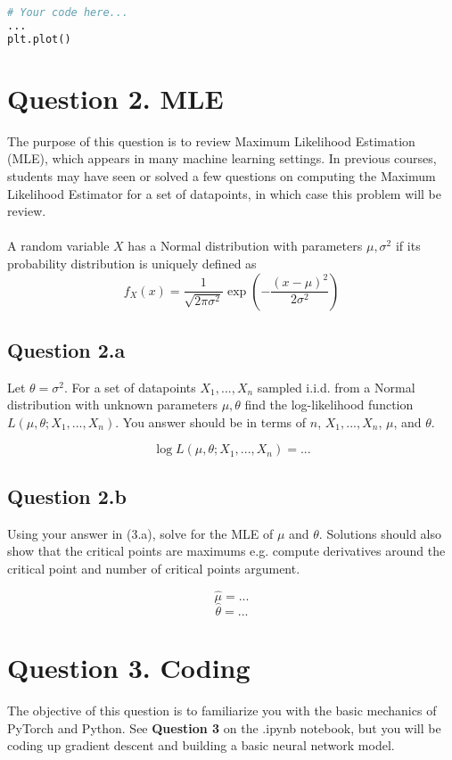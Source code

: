 \documentclass[12pt]{article}
\begin{document}
\begin{solution}
\begin{lstlisting}[language=Python]
# Your code here...
...
plt.plot()
\end{lstlisting}
\end{solution}
\newpage

\section*{Question 2. MLE }
The purpose of this question is to review Maximum Likelihood Estimation (MLE), which appears in many machine learning settings. In previous courses, students may have seen or solved a few questions on computing the Maximum Likelihood Estimator for a set of datapoints, in which case this problem will be review.
\\\\
A random variable $X$ has a Normal distribution with parameters $\mu,\sigma^2$ if its probability distribution is uniquely defined as
$$ f_X(x) = \frac{1}{\sqrt{2\pi \sigma^2}} \exp \left( - \frac{(x - \mu)^2}{2\sigma^2} \right)  $$

\subsection*{Question 2.a } 
Let $\theta = \sigma^2$. For a set of datapoints $X_1,...,X_n$ sampled i.i.d. from a Normal distribution with unknown parameters $\mu, \theta$ find the log-likelihood function $L(\mu, \theta; X_1,...,X_n)$. You answer should be in terms of $n$, $X_1,...,X_n$, $\mu$, and $\theta$.

\begin{solution}
    $$ \log L(\mu, \theta; X_1,...,X_n) = ... $$
\end{solution}
\subsection*{Question 2.b} 
Using your answer in (3.a), solve for the MLE of $\mu$ and $\theta$. Solutions should also show that the critical points are maximums e.g. compute derivatives around the critical point and number of critical points argument.
\begin{solution}
    $$ \hat{\mu} = ... $$
    $$ \hat{\theta} = ... $$
\end{solution}
\newpage

\section*{Question 3. Coding }
The objective of this question is to familiarize you with the basic mechanics of PyTorch and Python. See \textbf{Question 3} on the .ipynb notebook, but you will be coding up gradient descent and building a basic neural network model. 
\end{document}
